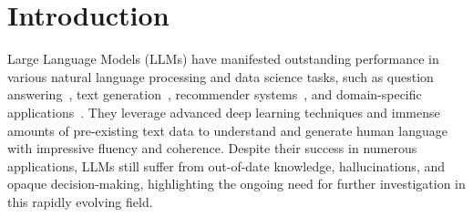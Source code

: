 \documentclass{article}
\begin{document}
\begin{abstract}


\end{abstract}

\vspace{-2mm}
\section{Introduction}
\vspace{-2mm}
\setcounter{footnote}{0}
Large Language Models (LLMs) have manifested outstanding performance in various natural language processing and data science tasks, such as question answering~\cite{wang2024t,li2024unigen,zhao2024comi}, text generation~\cite{ji2024chain, chen2023table, chen2023entity, gong2024graph}, recommender systems~\cite{zhang2023triple, zhang2024temporal, wu2024afdgcf, wang2024dynamic}, and domain-specific applications~\cite{tfwang-tsc-2023-hrl-acra, tfwang-ijcai-2024-flagvne, chen2024pre, wu2021linking, sun2024large}.
They leverage advanced deep learning techniques and immense amounts of pre-existing text data to understand and generate human language with impressive fluency and coherence.
Despite their success in numerous applications, LLMs still suffer from out-of-date knowledge, hallucinations, and opaque decision-making, highlighting the ongoing need for further investigation in this rapidly evolving field.
\end{document}
